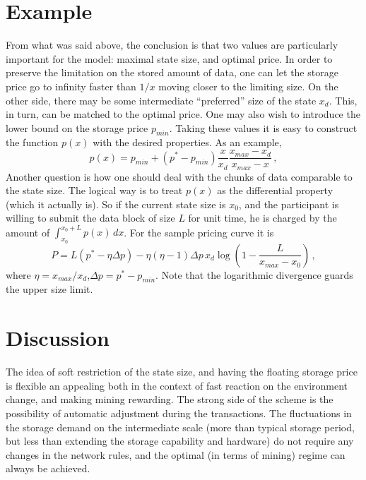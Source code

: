 \documentclass[preprint]{revtex4-1}
\begin{document}
\section{Example}
From what was said above, the conclusion is that two values are particularly
important for the model: maximal state size, and optimal price. In order to
preserve the limitation on the stored amount of data, one can let the storage price go to infinity
faster than $1/x$ moving closer to the limiting size. On the other side, there
may be some intermediate ``preferred'' size of the state $x_d$. This, in turn,
can be matched to the optimal price. One may also wish to introduce the lower
bound on the storage price $p_{min}$. Taking these values it is easy to
construct the function $p(x)$ with the desired properties. As an example,
\begin{equation}
    p(x) = p_{min}+(p^*-p_{min})\frac{x}{x_d}\frac{x_{max}-x_d}{x_{max}-x}\,,
    \label{eq:sample_price}
\end{equation}
Another question is how one should deal with the chunks of data comparable to
the state size. The logical way is to treat $p(x)$ as the differential property
(which it actually is). So if the current state size is $x_0$, and the
participant is willing to submit the data block of size $L$ for unit time, he is
charged by the amount of $\int_{x_0}^{x_0+L}p(x)\,dx$. For the sample pricing
curve it is
\begin{equation}
    P = L\left(p^*-\eta \Delta p \right)
    -
    \eta(\eta-1)\Delta p\, x_d
    \log\left(1-\frac{L}{x_{max}-x_0}\right)\,,
    \label{eq:sample_chunk}
\end{equation}
where $\eta=x_{max}/x_d$,$\Delta p=p^*-p_{min}$. Note that the logarithmic
divergence guards the upper size limit.

\section{Discussion}
The idea of soft restriction of the state size, and having the floating storage
price is flexible an appealing both in the context of fast reaction on the
environment change, and making mining rewarding. The strong side of the scheme
is the possibility of automatic adjustment during the transactions. The
fluctuations in the storage demand on the intermediate scale (more than typical
storage period, but less than extending the storage capability and hardware) do
not require any changes in the network rules, and the optimal (in terms of
mining) regime can always be achieved.
\end{document}
